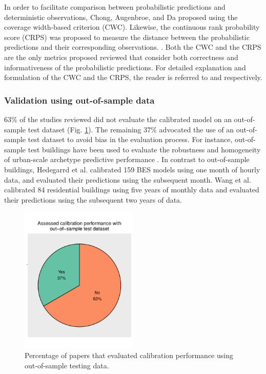 \documentclass[review]{elsarticle}
\begin{document}
In order to facilitate comparison between probabilistic predictions and deterministic observations, Chong, Augenbroe, and Da \cite{chong2021occupancy} proposed using the coverage width-based criterion (CWC). Likewise, the continuous rank probability score (CRPS) was proposed to measure the distance between the probabilistic predictions and their corresponding observations. \cite{li2016assessment}. Both the CWC and the CRPS are the only metrics proposed reviewed that consider both correctness and informativeness of the probabilistic predictions. For detailed explanation and formulation of the CWC and the CRPS, the reader is referred to \cite{chong2021occupancy} and \cite{gneiting2007strictly} respectively. 

\subsubsection{Validation using out-of-sample data}

63\% of the studies reviewed did not evaluate the calibrated model on an out-of-sample test dataset (Fig. \ref{fig:test}). The remaining 37\% advocated the use of an out-of-sample test dataset to avoid bias in the evaluation process. For instance, out-of-sample test buildings have been used to evaluate the robustness and homogeneity of urban-scale archetype predictive performance \cite{kristensen2018hierarchical, sokol2017validation, kristensen2020long}. In contrast to out-of-sample buildings, Hedegarrd et al. \cite{hedegaard2019bottom} calibrated 159 BES models using one month of hourly data, and evaluated their predictions using the subsequent month. Wang et al. \cite{wang2020bayesian} calibrated 84 residential buildings using five years of monthly data and evaluated their predictions using the subsequent two years of data.

\begin{figure}[!h]
\centering
\includegraphics[width=0.5\textwidth]{figures/test_data.pdf}
\caption{Percentage of papers that evaluated calibration performance using out-of-sample testing data.}
\label{fig:test}
\end{figure}
\end{document}
